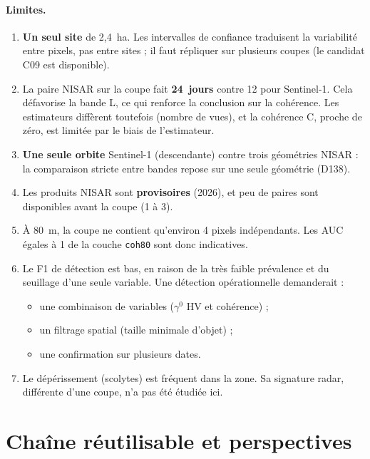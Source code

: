 \documentclass[11pt,a4paper]{article}
\begin{document}
\paragraph{Limites.}
\begin{enumerate}
\item \textbf{Un seul site} de 2,4~ha. Les intervalles de confiance traduisent la variabilité entre pixels, pas
  entre sites ; il faut répliquer sur plusieurs coupes (le candidat C09 est disponible).
\item La paire NISAR sur la coupe fait \textbf{24~jours} contre 12 pour Sentinel-1. Cela défavorise la bande L, ce
  qui renforce la conclusion sur la cohérence. Les estimateurs diffèrent toutefois (nombre de vues), et la
  cohérence C, proche de zéro, est limitée par le biais de l'estimateur.
\item \textbf{Une seule orbite} Sentinel-1 (descendante) contre trois géométries NISAR : la comparaison stricte entre
  bandes repose sur une seule géométrie (D138).
\item Les produits NISAR sont \textbf{provisoires} (2026), et peu de paires sont disponibles avant la coupe
  (1 à 3).
\item À 80~m, la coupe ne contient qu'environ 4 pixels indépendants. Les AUC égales à 1 de la couche
  \texttt{coh80} sont donc indicatives.
\item Le F1 de détection est bas, en raison de la très faible prévalence et du seuillage d'une seule variable. Une
  détection opérationnelle demanderait :
  \begin{itemize}
  \item une combinaison de variables ($\gamma^0$ HV et cohérence) ;
  \item un filtrage spatial (taille minimale d'objet) ;
  \item une confirmation sur plusieurs dates.
  \end{itemize}
\item Le dépérissement (scolytes) est fréquent dans la zone. Sa signature radar, différente d'une coupe, n'a pas été
  étudiée ici.
\end{enumerate}

\section{Chaîne réutilisable et perspectives}
\end{document}
